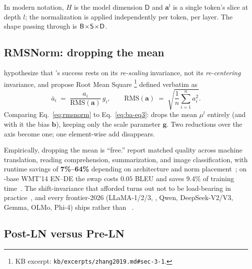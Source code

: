 In modern  notation, $H$ is the model dimension $\mathsf{D}$
and $\mathbf{a}^l$ is a single token's  slice at depth
$l$; the normalization is applied independently per token, per layer.
The shape passing through is $\mathsf{B}\!\times\!\mathsf{S}\!\times\!\mathsf{D}$.

\subsection{RMSNorm: dropping the mean}
\label{sec:norm-rmsnorm}

\citet{zhang2019} hypothesize that 's success rests on its
\emph{re-scaling} invariance, not its \emph{re-centering} invariance,
and propose Root Mean Square %
\footnote{KB excerpt: \texttt{kb/excerpts/zhang2019.md\#sec-3-1}.}
defined verbatim as
\begin{equation}
  \bar{a}_i \;=\; \frac{a_i}{\mathrm{RMS}(\mathbf{a})}\, g_i,
  \qquad
  \mathrm{RMS}(\mathbf{a}) \;=\;
  \sqrt{\frac{1}{n} \sum_{i=1}^{n} a_i^2}.
  \tag{Zhang--Eq.~4}
  \label{eq:rmsnorm}
\end{equation}
Comparing Eq.~\eqref{eq:rmsnorm} to Eq.~\eqref{eq:ba-eq3}:  drops
the mean $\mu^l$ entirely (and with it the bias $\mathbf{b}$), keeping
only the scale parameter $\mathbf{g}$. Two reductions over the 
axis become one; one element-wise add disappears.

Empirically, dropping the mean is ``free.'' \citet{zhang2019} report
matched quality across machine translation, reading comprehension,
summarization, and image classification, with runtime savings of
\textbf{7\%--64\%} depending on architecture and norm
placement~\citep[\S 4]{zhang2019}; on -base WMT'14 EN--DE
the swap costs $0.05$ BLEU and saves 9.4\% of training
time~\citep[\S 4]{zhang2019}. The shift-invariance that 
afforded turns out not to be load-bearing in
practice~\citep[\S 3.2]{zhang2019}, and every frontier-2026 
 (LLaMA-1/2/3, , Qwen, DeepSeek-V2/V3, Gemma, OLMo, Phi-4)
ships  rather than
~\citep{touvron2023,jiang2023,meta-llama3,deepseek-v3,qwen3,olmo2,gemma3}.

\subsection{Post-LN versus Pre-LN}
\label{sec:norm-placement}

